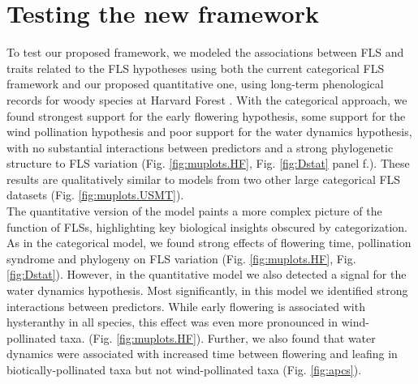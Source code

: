 \documentclass{article}
\begin{document}


\section*{Testing the new framework}

To test our proposed framework, we modeled the associations between FLS and traits related to the FLS hypotheses using both the current categorical FLS framework and our proposed quantitative one, using long-term phenological records for woody species at Harvard Forest \citep{OKeefe2015}. With the categorical approach, we found strongest support for the early flowering hypothesis, some support for the wind pollination hypothesis and poor support for the water dynamics hypothesis, with no substantial interactions between predictors and a strong phylogenetic structure to FLS variation (Fig. \ref{fig:muplots.HF}, Fig.  \ref{fig:Dstat} panel f.). These results are qualitatively similar to models from two other large categorical FLS datasets (Fig. \ref{fig:muplots.USMT}). \\

\noindent The quantitative version of the model paints a more complex picture of the function of FLSs, highlighting key biological insights obscured by categorization. As in the categorical model, we found strong effects of flowering time, pollination syndrome and phylogeny on FLS variation (Fig. \ref{fig:muplots.HF}, Fig. \ref{fig:Dstat}). However, in the quantitative model we also detected a signal for the water dynamics hypothesis. %
Most significantly, in this model we identified strong interactions between predictors. While early flowering is associated with hysteranthy in all species, this effect was even more pronounced in wind-pollinated taxa. (Fig. \ref{fig:muplots.HF}). Further, we also found that water dynamics were associated with increased time between flowering and leafing in biotically-pollinated taxa but not wind-pollinated taxa (Fig. \ref{fig:apcs}). \\ 
\end{document}
